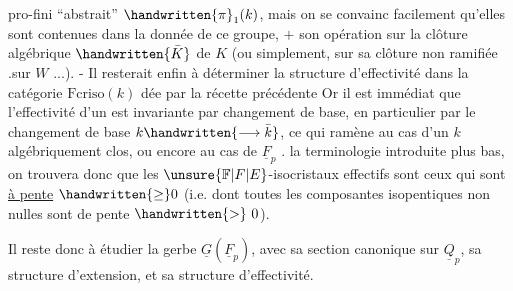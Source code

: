 
pro-fini ``abstrait'' $\handwritten{\pi}_1(k)$, mais on se convainc facilement qu'elles sont contenues dans la donnée de ce groupe, $+$ son opération sur la clôture algébrique $\handwritten{\bar{K}}$ de $K$ (ou simplement, sur sa clôture non ramifiée .sur $W$ ...)\handwritten{/}. - Il resterait enfin à déterminer la structure d'effectivité dans la catégorie $\mathrm{Fcriso}(k)$ dée par la récette précédente Or il est immédiat que l'effectivité d'un  est invariante par changement de base, en particulier par le changement de base $k\handwritten{\longrightarrow\bar{k}}$, ce qui ramène au cas d'un $k$ algébriquement clos, ou encore au cas de $\underline{F}_p$ .   la terminologie introduite plus bas, on trouvera donc que les $\unsure{\mathbb{F}|F|E}$-isocristaux effectifs sont ceux qui sont \uline{à pente} $\handwritten{\geq}0$ (i.e. dont toutes les composantes isopentiques  non nulles sont de pente $\handwritten{>}\ 0$).

 Il reste donc à étudier la gerbe $\underline{G}(\underline{F}_p)$, avec sa  section canonique sur $\underline{Q}_p$, sa structure d'extension, et sa structure d'effectivité.

